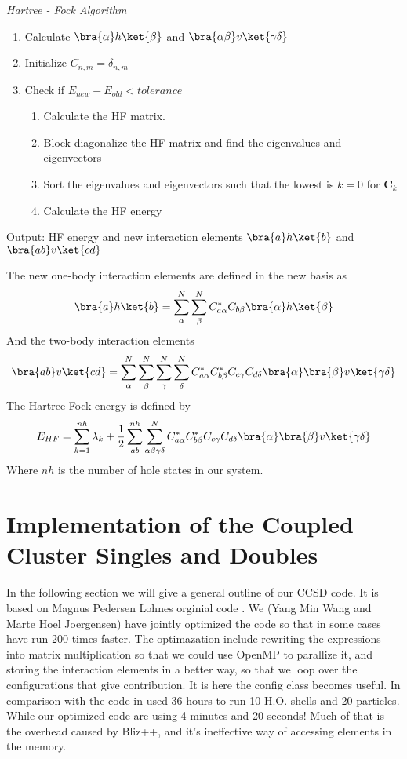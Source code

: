 \begin{algorithm}
\caption{\emph{Hartree - Fock Algorithm}}
\begin{enumerate}[1.]
\item Calculate $\bra{\alpha}h\ket{\beta}$ and $\bra{\alpha\beta}v\ket{\gamma\delta}$
\item Initialize $C_{n,m} = \delta_{n,m}$
\item Check if $E_{new} - E_{old} < tolerance$
\begin{enumerate}[1.]
\item Calculate the HF matrix.
\item Block-diagonalize the HF matrix and find the eigenvalues and eigenvectors
\item Sort the eigenvalues and eigenvectors such that the lowest is $k=0$ for $\mathbf{C}_k$
\item Calculate the HF energy
\end{enumerate}
\end{enumerate}
Output: HF energy and new interaction elements $\bra{a}h\ket{b}$ and $\bra{ab}v\ket{cd}$
\end{algorithm}
%
The new one-body interaction elements are defined in the new basis as
%
\begin{equation}
 \bra{a}h\ket{b} = \sum_{\alpha}^N\sum_{\beta}^N C_{a\alpha}^*C_{b\beta} \bra{\alpha}h\ket{\beta}
\end{equation}
%
And the two-body interaction elements
%
\begin{equation}
 \bra{ab}v\ket{cd} = \sum_{\alpha}^N\sum_{\beta}^N\sum_{\gamma}^N\sum_{\delta}^N C_{a\alpha}^*C_{b\beta}^* C_{c\gamma}C_{d\delta}  \bra{\alpha}\bra{\beta}v\ket{\gamma\delta}
\end{equation}
%
The Hartree Fock energy is defined by
%
\begin{equation}
  E_{HF} = \sum_{k=1}^{nh} \lambda_k + \frac{1}{2} \sum_{ab}^{nh}\sum_{\alpha\beta\gamma\delta}^N  C_{a\alpha}^*C_{b\beta}^* C_{c\gamma}C_{d\delta}  \bra{\alpha}\bra{\beta}v\ket{\gamma\delta}
\end{equation}
% 
Where $nh$ is the number of hole states in our system.


\section{Implementation of the Coupled Cluster Singles and Doubles}
In the following section we will give a general outline of our CCSD code. It is based on Magnus Pedersen Lohnes orginial code \cite{lohne}. We (Yang Min Wang and Marte Hoel Joergensen) have jointly optimized the code so that in some cases have run 200 times faster. The optimazation include rewriting the expressions into matrix multiplication so that we could use OpenMP to parallize it, and storing the interaction elements in a better way, so that we loop over the configurations that give contribution. It is here the config class becomes useful. In comparison with the code in \cite{lohne} used 36 hours to run 10 H.O. shells and 20 particles. While our optimized code are using 4 minutes and 20 seconds! Much of that is the overhead caused by Bliz++, and it's ineffective way of accessing elements in the memory.  

